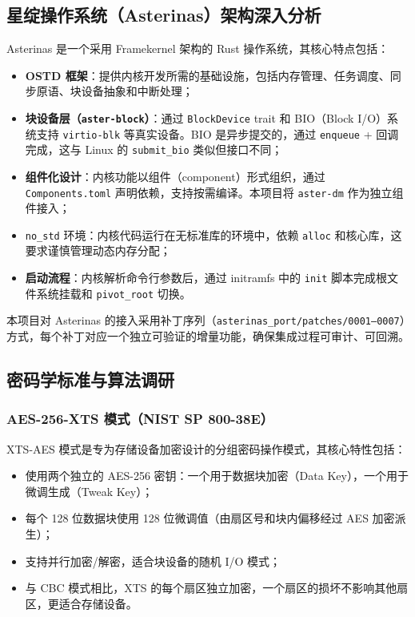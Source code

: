 \subsection{星绽操作系统（Asterinas）架构深入分析}

Asterinas 是一个采用 Framekernel 架构的 Rust 操作系统，其核心特点包括：

\begin{itemize}
    \item \textbf{OSTD 框架}：提供内核开发所需的基础设施，包括内存管理、任务调度、同步原语、块设备抽象和中断处理；
    \item \textbf{块设备层（\texttt{aster-block}）}：通过 \texttt{BlockDevice} trait 和 BIO（Block I/O）系统支持 \texttt{virtio-blk} 等真实设备。BIO 是异步提交的，通过 \texttt{enqueue} + 回调完成，这与 Linux 的 \texttt{submit\_bio} 类似但接口不同；
    \item \textbf{组件化设计}：内核功能以组件（component）形式组织，通过 \texttt{Components.toml} 声明依赖，支持按需编译。本项目将 \texttt{aster-dm} 作为独立组件接入；
    \item \texttt{no\_std} 环境：内核代码运行在无标准库的环境中，依赖 \texttt{alloc} 和核心库，这要求谨慎管理动态内存分配；
    \item \textbf{启动流程}：内核解析命令行参数后，通过 initramfs 中的 \texttt{init} 脚本完成根文件系统挂载和 \texttt{pivot\_root} 切换。
\end{itemize}

本项目对 Asterinas 的接入采用补丁序列（\texttt{asterinas\_port/patches/0001--0007}）方式，每个补丁对应一个独立可验证的增量功能，确保集成过程可审计、可回溯。

\subsection{密码学标准与算法调研}

\subsubsection{AES-256-XTS 模式（NIST SP 800-38E）}

XTS-AES 模式是专为存储设备加密设计的分组密码操作模式，其核心特性包括：

\begin{itemize}
    \item 使用两个独立的 AES-256 密钥：一个用于数据块加密（Data Key），一个用于微调生成（Tweak Key）；
    \item 每个 128 位数据块使用 128 位微调值（由扇区号和块内偏移经过 AES 加密派生）；
    \item 支持并行加密/解密，适合块设备的随机 I/O 模式；
    \item 与 CBC 模式相比，XTS 的每个扇区独立加密，一个扇区的损坏不影响其他扇区，更适合存储设备。
\end{itemize}

